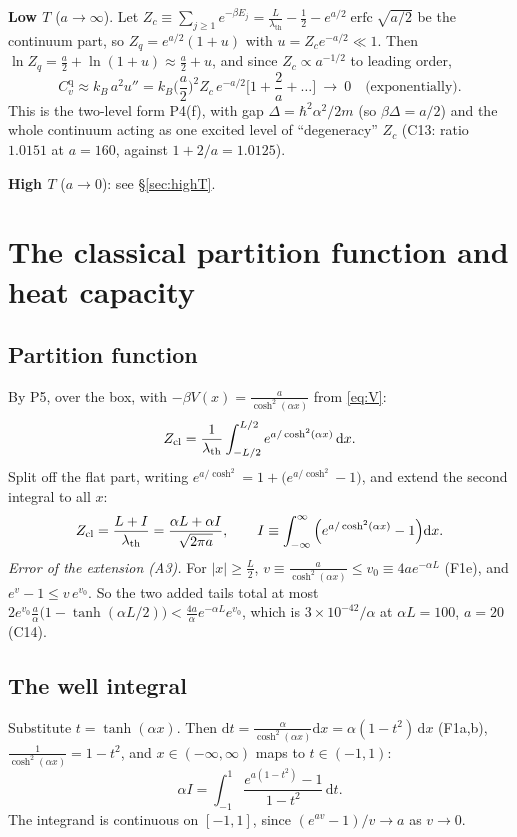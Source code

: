\documentclass[11pt]{article}
\numberwithin{equation}{section}
\newcommand{\dd}{\mathrm{d}}
\newcommand{\erfc}{\operatorname{erfc}}
\newcommand{\lth}{\lambda_{\mathrm{th}}}
\newcommand{\Cq}{C_v^{\mathrm{q}}}
\newcommand{\kB}{k_B}
\newcommand{\Eu}{\hbar^2\alpha^2/2m}
\newcommand{\tL}{\tanh(\alpha L/2)}
\newcommand{\own}[1]{\par\noindent{\footnotesize\textcolor{owncol}{\textsf{\textbf{Own step.}} #1}}\par}
\newcommand{\chk}[1]{{\footnotesize\textsf{(#1)}}}
\begin{document}
\textbf{Low $T$} ($a\to\infty$). Let $Z_c\equiv\sum_{j\ge1}e^{-\beta E_j}=\frac{L}{\lth}-\frac12-e^{a/2}\erfc\sqrt{a/2}$ be the continuum part, so $Z_q=e^{a/2}(1+u)$ with $u=Z_ce^{-a/2}\ll1$. Then $\ln Z_q=\frac a2+\ln(1+u)\approx\frac a2+u$, and since $Z_c\propto a^{-1/2}$ to leading order,
\begin{equation}
\Cq\approx\kB\,a^2u''=\kB\Big(\frac a2\Big)^2Z_c\,e^{-a/2}\Big[1+\frac2a+\dots\Big]\ \longrightarrow\ 0\quad\text{(exponentially)}.
\label{eq:Cqlow}
\end{equation}
This is the two-level form P4(f), with gap $\Delta=\Eu$ (so $\beta\Delta=a/2$) and the whole continuum acting as one excited level of ``degeneracy'' $Z_c$ \chk{C13: ratio $1.0151$ at $a=160$, against $1+2/a=1.0125$}.

\textbf{High $T$} ($a\to0$): see \S\ref{sec:highT}.
\own{Eqs.~\eqref{eq:Bder}--\eqref{eq:Cqlow}.}

\section{The classical partition function and heat capacity}
\label{sec:classical}

\subsection{Partition function}
By P5, over the box, with $-\beta V(x)=\frac{a}{\cosh^2(\alpha x)}$ from \eqref{eq:V}:
\begin{equation}
Z_{\rm cl}=\frac{1}{\lth}\int_{-L/2}^{L/2}e^{a/\cosh^2(\alpha x)}\,\dd x .
\label{eq:Zcl0}
\end{equation}
Split off the flat part, writing $e^{a/\cosh^2}=1+\big(e^{a/\cosh^2}-1\big)$, and extend the second integral to all $x$:
\begin{equation}
Z_{\rm cl}=\frac{L+I}{\lth}=\frac{\alpha L+\alpha I}{\sqrt{2\pi a}},\qquad I\equiv\int_{-\infty}^{\infty}\Big(e^{a/\cosh^2(\alpha x)}-1\Big)\dd x .
\label{eq:Zcl}
\end{equation}
\emph{Error of the extension (A3).} For $|x|\ge\frac L2$, $v\equiv\frac{a}{\cosh^2(\alpha x)}\le v_0\equiv4ae^{-\alpha L}$ (F1e), and $e^v-1\le v\,e^{v_0}$. So the two added tails total at most $2e^{v_0}\frac a\alpha\big(1-\tL\big)<\frac{4a}{\alpha}e^{-\alpha L}e^{v_0}$, which is $3\times10^{-42}/\alpha$ at $\alpha L=100$, $a=20$ \chk{C14}.

\subsection{The well integral}
Substitute $t=\tanh(\alpha x)$. Then $\dd t=\frac{\alpha}{\cosh^2(\alpha x)}\dd x=\alpha(1-t^2)\,\dd x$ (F1a,b), $\frac{1}{\cosh^2(\alpha x)}=1-t^2$, and $x\in(-\infty,\infty)$ maps to $t\in(-1,1)$:
\begin{equation}
\alpha I=\int_{-1}^{1}\frac{e^{a(1-t^2)}-1}{1-t^2}\,\dd t .
\label{eq:It}
\end{equation}
The integrand is continuous on $[-1,1]$, since $(e^{av}-1)/v\to a$ as $v\to0$.
\end{document}

